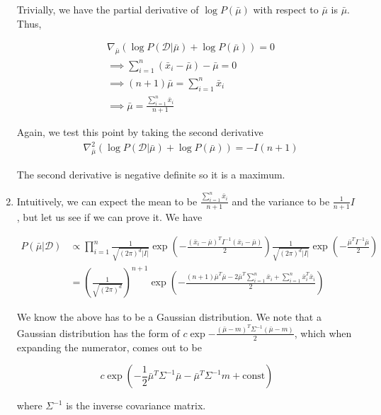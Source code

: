 \documentclass[11pt]{article}
\begin{document}
\begin{enumerate}
		Trivially, we have the partial derivative of $\log P(\bar{\mu})$ with respect to $\bar{\mu}$ is $\bar{\mu}$. Thus, 
		
		\begin{align*}
		    &\nabla_{\bar{\mu}} (\log P(\mathcal{D} | \bar{\mu}) + \log P(\bar{\mu})) = 0\\
		    &\implies \sum_{i=1}^n( \bar{x}_i - \bar{\mu}) - \bar{\mu} = 0 \\
		    &\implies (n+1)\bar{\mu} = \sum_{i=1}^n \bar{x}_i \\
		    &\implies \boxed{\bar{\mu} = \frac{\sum_{i=1}^n \bar{x}_i}{n+1}}
		\end{align*}
		
		Again, we test this point by taking the second derivative
		\begin{align*}
            &\nabla_{\bar{\mu}}^2 (\log P(\mathcal{D} | \bar{\mu}) + \log P(\bar{\mu})) = -I(n+1)
		\end{align*}
		
		The second derivative is negative definite so it is a maximum.
		
		\item Intuitively, we can expect the mean to be $\frac{\sum_{i=1}^n \bar{x}_i}{n+1}$ and the variance to be $\frac{1}{n+1}I$, but let us
		see if we can prove it. We have 
		
		\begin{align*}
		    P(\bar{\mu} | \mathcal{D}) &\propto \prod_{i=1}^n \frac{1}{\sqrt{\left ( 2 \pi \right )^d |I|}} \exp \left ( -\frac{\left ( \bar{x}_i - \bar{\mu} \right )^TI^{-1} \left ( \bar{x}_i - \bar{\mu} \right )}{2} \right ) \frac{1}{\sqrt{\left (2 \pi \right )^d |I|}} \exp \left (- \frac{\bar{\mu}^TI^{-1}\bar{\mu}}{2} \right ) \\
		    &= \left ( \frac{1}{\sqrt{(2\pi)^d}} \right )^{n+1} \exp \left (-\frac{(n+1)\bar{\mu}^T\bar{\mu} - 2\bar{\mu}^T\sum_{i=1}^n\bar{x}_i + \sum_{i=1}^n\bar{x}_i^T\bar{x}_i}{2} \right )
		\end{align*}
		
		We know the above has to be a Gaussian distribution. We note that a Gaussian distribution has the form of $c \exp {-\frac{(\bar{\mu}-m)^T\Sigma^{-1}(\bar{\mu}-m)}{2}}$,
		which when expanding the numerator, comes out to be
		
		\[c \exp \left (-\frac{1}{2} \bar{\mu}^T\Sigma^{-1}\bar{\mu} - \bar{\mu}^T \Sigma^{-1} m + \text{const} \right )\]
		
		where $\Sigma^{-1}$ is the inverse covariance matrix.
		

\end{enumerate}
\end{document}
